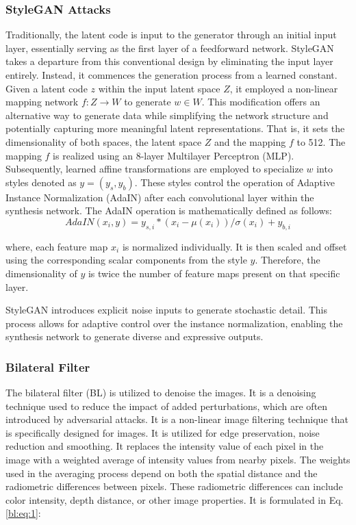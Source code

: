 \documentclass[sn-mathphys]{sn-jnl}%
\theoremstyle{thmstyleone}%
\theoremstyle{thmstyletwo}%
\theoremstyle{thmstylethree}%
\begin{document}
\subsubsection{StyleGAN Attacks}
Traditionally, the latent code is input to the generator through an initial input layer, essentially serving as the first layer of a feedforward network. StyleGAN takes a departure from this conventional design by eliminating the input layer entirely. Instead, it commences the generation process from a learned constant.  Given a latent code $z$ within the input latent space $Z$, it employed a non-linear mapping network $f: Z → W$ to generate $w \in W$. This modification offers an alternative way to generate data while simplifying the network structure and potentially capturing more meaningful latent representations. That is, it sets the dimensionality of both spaces, the latent space $Z$ and the mapping $f$ to 512. The mapping $f$ is realized using an 8-layer Multilayer Perceptron (MLP). Subsequently, learned affine transformations are employed to specialize $w$ into styles denoted as $y = (y_s, y_b)$. These styles control the operation of Adaptive Instance Normalization (AdaIN) after each convolutional layer within the synthesis network. The AdaIN operation is mathematically defined as follows:
\begin{equation}
    AdaIN(x_i, y) = y_{s,i} * (x_i - \mu(x_i)) / \sigma(x_i) + y_{b,i}
\end{equation}

where, each feature map $x_i$ is normalized individually. It is then scaled and offset using the corresponding scalar components from the style $y$. Therefore, the dimensionality of $y$ is twice the number of feature maps present on that specific layer. 

StyleGAN introduces explicit noise inputs to generate stochastic detail. This process allows for adaptive control over the instance normalization, enabling the synthesis network to generate diverse and expressive outputs.


\subsubsection{Bilateral Filter}
 The bilateral filter (BL) \cite{tomasi1998bilateral} is utilized to denoise the images. It is a denoising technique used to reduce the impact of added perturbations, which are often introduced by adversarial attacks.  It is a non-linear image filtering technique that is specifically designed for images. It is utilized for edge preservation, noise reduction and smoothing. It replaces the intensity value of each pixel in the image with a weighted average of intensity values from nearby pixels. The weights used in the averaging process depend on both the spatial distance and the radiometric differences between pixels.
 These radiometric differences can include color intensity, depth distance, or other image properties. It is formulated in Eq. \ref{bl:eq:1}:
 
\end{document}
